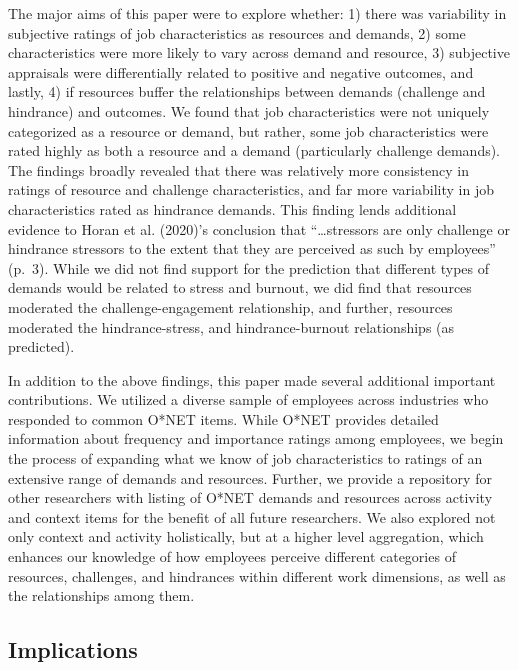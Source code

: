 \documentclass[
  man]{apa7}
\begin{document}
The major aims of this paper were to explore whether: 1) there was variability in subjective ratings of job characteristics as resources and demands, 2) some characteristics were more likely to vary across demand and resource, 3) subjective appraisals were differentially related to positive and negative outcomes, and lastly, 4) if resources buffer the relationships between demands (challenge and hindrance) and outcomes. We found that job characteristics were not uniquely categorized as a resource or demand, but rather, some job characteristics were rated highly as both a resource and a demand (particularly challenge demands). The findings broadly revealed that there was relatively more consistency in ratings of resource and challenge characteristics, and far more variability in job characteristics rated as hindrance demands. This finding lends additional evidence to Horan et al. (2020)'s conclusion that ``\ldots stressors are only challenge or hindrance stressors to the extent that they are perceived as such by employees'' (p.~3). While we did not find support for the prediction that different types of demands would be related to stress and burnout, we did find that resources moderated the challenge-engagement relationship, and further, resources moderated the hindrance-stress, and hindrance-burnout relationships (as predicted).

In addition to the above findings, this paper made several additional important contributions. We utilized a diverse sample of employees across industries who responded to common O*NET items. While O*NET provides detailed information about frequency and importance ratings among employees, we begin the process of expanding what we know of job characteristics to ratings of an extensive range of demands and resources. Further, we provide a repository for other researchers with listing of O*NET demands and resources across activity and context items for the benefit of all future researchers. We also explored not only context and activity holistically, but at a higher level aggregation, which enhances our knowledge of how employees perceive different categories of resources, challenges, and hindrances within different work dimensions, as well as the relationships among them.

\hypertarget{implications}{%
\subsection{Implications}\label{implications}}
\end{document}
